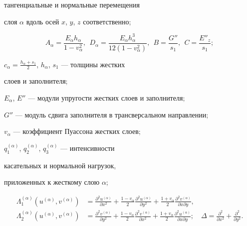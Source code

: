 тангенциальные и нормальные перемещения 


слоя $\alpha$ вдоль осей $x$, $y$, $z$ соответственно; 


$$ 


A_\alpha=\frac{E_\alpha h_\alpha}{1-v^2_\alpha},\ \ 


D_\alpha=\frac{E_\alpha h^3_\alpha}{12(1-v^2_\alpha)},\ \ 


B=\frac{G''}{s_1},\ \ C=\frac{E''_z}{s_1}; 


$$ 


$c_\alpha=\frac{h_\alpha+s_1}{2}$, $h_\alpha$, $s_1$ --- толщины жестких 


слоев и заполнителя; 


$E_\alpha$, $E''$ --- модули упругости жестких слоев и заполнителя; 


$G''$ --- модуль сдвига заполнителя в трансверсальном направлении; 


$v_\alpha$ --- коэффициент Пуассона жестких слоев; 


$q^{(\alpha)}_1$, $q^{(\alpha)}_2$, $q^{(\alpha)}_3$ --- интенсивности 


касательных и нормальной нагрузок, 


приложенных к жесткому слою $\alpha$; 


\begin{align*} 


\Lambda^{(\alpha)}_1(u^{(\alpha)},v^{(\alpha)})&= 


\frac{\partial^2u^{(\alpha)}}{\partial x^2}+\frac{1-v_\alpha}{2} 


\frac{\partial^2u^{(\alpha)}}{\partial y^2} 


+\frac{1+v_\alpha}{2} 


\frac{\partial^2v^{(\alpha)}}{\partial x\partial y},\\ 


% 


\Lambda^{(\alpha)}_2(u^{(\alpha)},v^{(\alpha)})&= 


\frac{\partial^2v^{(\alpha)}}{\partial y^2}+\frac{1-v_\alpha}{2} 


\frac{\partial^2v^{(\alpha)}}{\partial x^2} 


+\frac{1+v_\alpha}{2} 


\frac{\partial^2u^{(\alpha)}}{\partial x\partial y};\quad 


\Delta=\frac{\partial^2}{\partial x^2}+ 


\frac{\partial^2}{\partial y^2}.


\end{align*} 


